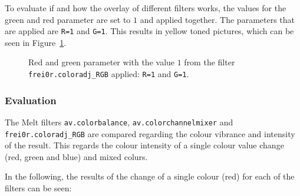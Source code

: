 \documentclass[../MasterThesis.tex]{subfiles}
\begin{document}
To evaluate if and how the overlay of different filters works, the values for the green and red parameter are set to $1$ and applied together. The parameters that are applied are \texttt{R=1} and \texttt{G=1}. This results in yellow toned pictures, which can be seen in Figure~\ref{figure:rg}.


\begin{figure}[H]
	\begin{center}
		\label{figure:rg}
		\caption[Red and green parameter set to $1$ with \texttt{frei0r.coloradj\_RGB}.]{Red and green parameter with the value $1$ from the filter \texttt{frei0r.coloradj\_RGB} applied: \texttt{R=1} and \texttt{G=1}.}
	\end{center}
\end{figure}




\subsubsection*{Evaluation}




The Melt filters \texttt{av.colorbalance}, \texttt{av.colorchannelmixer} and \texttt{frei0r.coloradj\_RGB} are compared regarding the colour vibrance and intensity of the result. This regards the colour intensity of a single colour value change (red, green and blue) and mixed colurs.


In the following, the results of the change of a single colour (red) for each of the filters can be seen:
\end{document}
